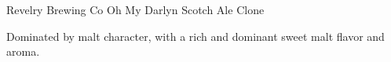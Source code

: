 \begin{recipe}{Revelry Brewing Co Oh My Darlyn Scotch Ale Clone} %

\begin{aboutblock}
Dominated by malt character, with a rich and dominant sweet malt flavor and aroma.
\sourceaha
\end{aboutblock}


\begin{methodandtiming}

\begin{mashsteps}
\end{mashsteps}

\begin{fermentationsteps}
\end{fermentationsteps}

\end{methodandtiming}

\recipebreak

\begin{ingredientsblock}

\begin{malts}
\end{malts}

\begin{hops}
\end{hops}


\end{ingredientsblock}

\end{recipe}

